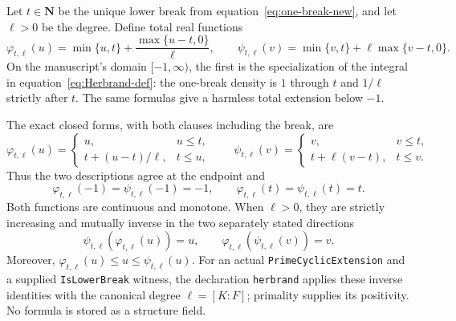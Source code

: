 \begin{definition}\label{mod:ramification-herbrand}
Let $t\in\mathbf N$ be the unique lower break from
equation~\ref{eq:one-break-new}, and let $\ell>0$ be the degree.  Define
total real functions
\[
 \varphi_{t,\ell}(u)
 =\min\{u,t\}+\frac{\max\{u-t,0\}}{\ell},
 \qquad
 \psi_{t,\ell}(v)
 =\min\{v,t\}+\ell\max\{v-t,0\}.
\]
On the manuscript's domain $[-1,\infty)$, the first is the specialization
of the integral in equation~\ref{eq:Herbrand-def}: the one-break density is
$1$ through $t$ and $1/\ell$ strictly after $t$.  The same formulas give a
harmless total extension below $-1$.

The exact closed forms, with both clauses including the break, are
\[
 \varphi_{t,\ell}(u)=
 \begin{cases}
  u,&u\le t,\\
  t+(u-t)/\ell,&t\le u,
 \end{cases}
 \qquad
 \psi_{t,\ell}(v)=
 \begin{cases}
  v,&v\le t,\\
  t+\ell(v-t),&t\le v.
 \end{cases}
\]
Thus the two descriptions agree at the endpoint and
\[
 \varphi_{t,\ell}(-1)=\psi_{t,\ell}(-1)=-1,
 \qquad
 \varphi_{t,\ell}(t)=\psi_{t,\ell}(t)=t.
\]
Both functions are continuous and monotone.  When $\ell>0$, they are
strictly increasing and mutually inverse in the two separately stated
directions
\[
 \psi_{t,\ell}(\varphi_{t,\ell}(u))=u,
 \qquad
 \varphi_{t,\ell}(\psi_{t,\ell}(v))=v.
\]
Moreover,
\(\varphi_{t,\ell}(u)\le u\le\psi_{t,\ell}(u)\).
For an actual \texttt{PrimeCyclicExtension} and a supplied
\texttt{IsLowerBreak} witness, the declaration \texttt{herbrand} applies
these inverse identities with the canonical degree
$\ell=[K:F]$; primality supplies its positivity.  No formula is stored as
a structure field.


\end{definition}
